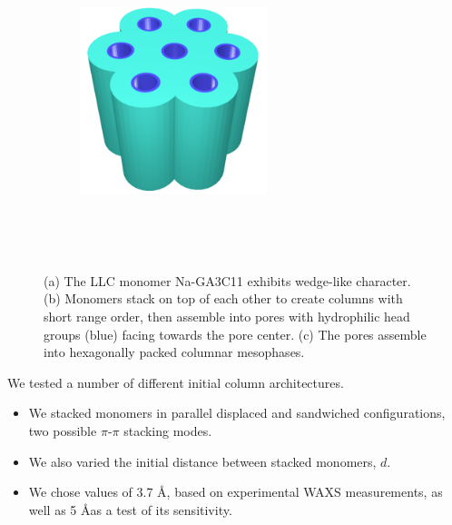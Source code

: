 \documentclass{article}
\begin{document}
\begin{figure}[!htb]
\begin{subfigure}{0.325\linewidth}
              \caption{}~\label{fig:wedge_layer}
      \end{subfigure}
      \begin{subfigure}{0.325\linewidth}
              \centering
              \includegraphics[width=0.6\textwidth]{hexagonal_packing.pdf}
              \caption{}~\label{fig:hex_packing_simple}
      \end{subfigure}
      \caption{(a) The LLC monomer Na-GA3C11 exhibits wedge-like character. (b) 
      Monomers stack on top of each other to create columns with short range order,
      then assemble into pores with hydrophilic head groups (blue) facing towards 
      the pore center. (c) The pores assemble into hexagonally packed columnar
      mesophases.}~\label{fig:assembly}
  \end{figure}
  
  \noindent We tested a number of different initial column architectures. 
  \begin{itemize}
      \item We stacked monomers in parallel displaced and sandwiched 
      configurations, two possible $\pi$-$\pi$ stacking modes.\cite{sinnokrot_estimates_2002}
      \item We also varied the initial distance between stacked monomers, $d$.
      \item We chose values of 3.7 \AA, based on experimental WAXS 
      measurements, as well as 5 \AA as a test of its sensitivity.
  \end{itemize}
  
\end{document}
